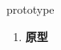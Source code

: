 
\begin{frame}
{\huge prototype}
\begin{center}
\begin{enumerate}\Large
  \item \textbf{原型}
\end{enumerate}
\end{center}
\end{frame}
